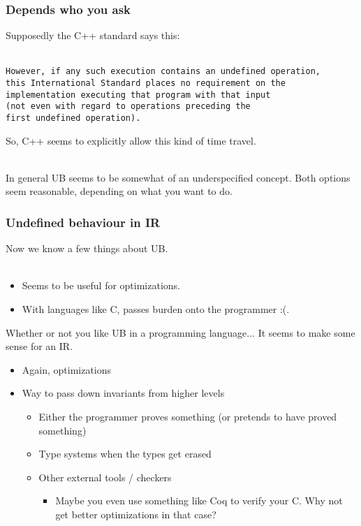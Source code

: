 \documentclass[handout]{beamer}
\begin{document}
\begin{frame}[fragile]
  \frametitle{Depends who you ask}

  Supposedly the C++ standard says this:\\~

\begin{verbatim}
However, if any such execution contains an undefined operation,
this International Standard places no requirement on the
implementation executing that program with that input
(not even with regard to operations preceding the
first undefined operation).
\end{verbatim}

  \pause

  So, C++ seems to explicitly allow this kind of time travel.\\~

  In general UB seems to be somewhat of an underspecified
  concept. Both options seem reasonable, depending on what you want to
  do.

\end{frame}

\begin{frame}
  \frametitle{Undefined behaviour in IR}

  Now we know a few things about UB.\\~

  \begin{itemize}
  \item Seems to be useful for optimizations.
  \item With languages like C, passes burden onto the programmer :(.
  \end{itemize}

  Whether or not you like UB in a programming language... It seems to
  make some sense for an IR.

  \begin{itemize}
  \item Again, optimizations
  \item Way to pass down invariants from higher levels
    \begin{itemize}
    \item Either the programmer proves something (or pretends to have
      proved something)
    \item Type systems when the types get erased
    \item Other external tools / checkers
      \begin{itemize}
      \item Maybe you even use something like Coq to verify your
        C. Why not get better optimizations in that case?
      \end{itemize}
    \end{itemize}
  \end{itemize}
\end{frame}
\end{document}
